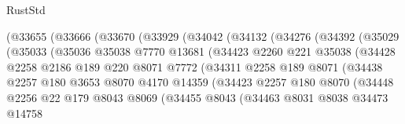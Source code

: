 \begin{lexlean}{RustStd}
\begin{coremodule}
                  (@33655
                    (@33666
                      (@33670
                        (@33929
                          (@34042
                            (@34132
                              (@34276
                                (@34392
                                  (@35029
                                    (@35033
                                      (@35036
                                        @35038
                                        @7770
                                        @13681
                                        (@34423
                                          @2260
                                          @221
                                          @35038
                                          (@34428
                                            @2258
                                            @2186
                                            @189
                                            @220
                                            @8071
                                            @7772
                                            (@34311
                                              @2258
                                              @189
                                              @8071
                                              (@34438
                                                @2257
                                                @180
                                                @3653
                                                @8070
                                                @4170
                                                @14359
                                                (@34423
                                                  @2257
                                                  @180
                                                  @8070
                                                  (@34448
                                                    @2256
                                                    @22
                                                    @179
                                                    @8043
                                                    @8069
                                                    (@34455
                                                      @8043
                                                      (@34463
                                                        @8031
                                                        @8038
                                                        @34473
                                                        @14758

\end{coremodule}
\end{lexlean}
